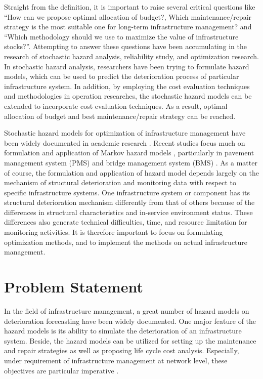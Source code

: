 Straight from the definition, it is important to raise several critical questions like ``How can we propose optimal allocation of budget?, Which maintenance/repair strategy is the most suitable one for long-term infrastructure management? and ``Which methodology should we use to maximize the value of infrastructure stocks?''. Attempting to answer these questions have been accumulating in the research of stochastic hazard analysis, reliability study, and optimization research. In stochastic hazard analysis, researchers have been trying to formulate hazard models, which can be used to predict the deterioration process of particular infrastructure system. In addition, by employing the cost evaluation techniques and methodologies in operation researches, the stochastic hazard models can be extended to incorporate cost evaluation techniques. As a result, optimal allocation of budget and best maintenance/repair strategy can be reached.

Stochastic hazard models for optimization of infrastructure management have been widely documented in academic research \cite{madanat95,Mishalani02,jido,ziad}. Recent studies focus much on formulation and application of Markov hazard models \cite{Takeyama,kobayashitsuda,Morcous05}, particularly in pavement management system (PMS) and bridge management system (BMS) \cite{pontis,Robelin07,kumada}. As a matter of course, the formulation and application of hazard model depends largely on the mechanism of structural deterioration and monitoring data with respect to specific infrastructure systems. One  infrastructure system or component has its structural deterioration mechanism differently from that of others because of the differences in structural characteristics and in-service environment status. These differences also generate technical difficulties, time, and resource limitation for monitoring activities. It is therefore important to focus on formulating optimization methods, and to implement the methods on actual infrastructure management.
%
%
\section{Problem Statement}
%
In the field of infrastructure management, a great number of hazard models on deterioration forecasting have been widely documented. One major feature of the hazard models is its ability to simulate the deterioration of an infrastructure system. Beside, the hazard models can be utilized for setting up the maintenance and repair strategies as well as proposing life cycle cost analysis. Especially, under requirement of infrastructure management at network level, these objectives are particular imperative \citep{aokia,kobayashitsuda}.

